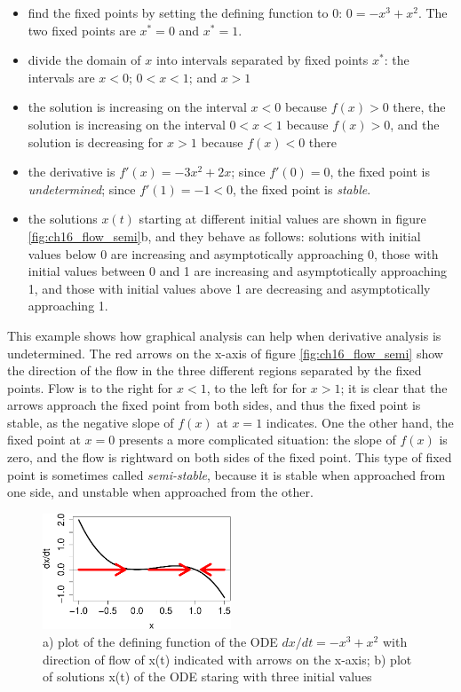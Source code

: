 \documentclass[
  letterpaper,
  DIV=11,
  numbers=noendperiod]{scrreprt}
\begin{document}
\begin{itemize}
\item
  find the fixed points by setting the defining function to 0:
  \(0 = -x^3 + x^2\). The two fixed points are \(x^*=0\) and \(x^*=1\).
\item
  divide the domain of \(x\) into intervals separated by fixed points
  \(x^*\): the intervals are \(x<0\); \(0<x<1\); and \(x>1\)
\item
  the solution is increasing on the interval \(x<0\) because \(f(x)>0\)
  there, the solution is increasing on the interval \(0<x<1\) because
  \(f(x)>0\), and the solution is decreasing for \(x>1\) because
  \(f(x)<0\) there
\item
  the derivative is \(f'(x)=-3x^2+2x\); since \(f'(0)=0\), the fixed
  point is \emph{undetermined}; since \(f'(1)=-1<0\), the fixed point is
  \emph{stable}.
\item
  the solutions \(x(t)\) starting at different initial values are shown
  in figure \ref{fig:ch16_flow_semi}b, and they behave as follows:
  solutions with initial values below 0 are increasing and
  asymptotically approaching 0, those with initial values between 0 and
  1 are increasing and asymptotically approaching 1, and those with
  initial values above 1 are decreasing and asymptotically approaching
  1.
\end{itemize}

This example shows how graphical analysis can help when derivative
analysis is undetermined. The red arrows on the x-axis of figure
\ref{fig:ch16_flow_semi} show the direction of the flow in the three
different regions separated by the fixed points. Flow is to the right
for \(x<1\), to the left for for \(x>1\); it is clear that the arrows
approach the fixed point from both sides, and thus the fixed point is
stable, as the negative slope of \(f(x)\) at \(x=1\) indicates. One the
other hand, the fixed point at \(x=0\) presents a more complicated
situation: the slope of \(f(x)\) is zero, and the flow is rightward on
both sides of the fixed point. This type of fixed point is sometimes
called \emph{semi-stable}, because it is stable when approached from one
side, and unstable when approached from the other.

\begin{figure}

{\centering \includegraphics[width=0.5\textwidth,height=\textheight]{./graph_odes_files/figure-pdf/ch7-flow3-1.pdf}

}

\caption{a) plot of the defining function of the ODE
\(dx/dt = -x^3 + x^2\) with direction of flow of x(t) indicated with
arrows on the x-axis; b) plot of solutions x(t) of the ODE staring with
three initial values}

\end{figure}
\end{document}
